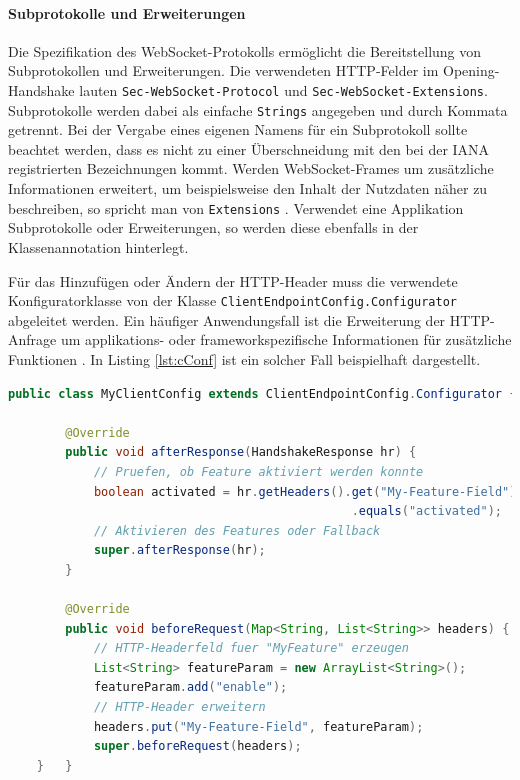\documentclass[11pt,a4paper,titlepage]{scrartcl}
\numberwithin{equation}{section}
\begin{document}
\begin{mdframed}[hidealllines=true,backgroundcolor=lightgray]
\paragraph{Subprotokolle und Erweiterungen}
Die Spezifikation des WebSocket-Protokolls ermöglicht die Bereitstellung von Subprotokollen und Erweiterungen. Die verwendeten HTTP-Felder im Opening-Handshake lauten \texttt{Sec-WebSocket-Protocol} und \texttt{Sec-WebSocket-Extensions}. Subprotokolle werden dabei als einfache \texttt{Strings} angegeben und durch Kommata getrennt. Bei der Vergabe eines eigenen Namens für ein Subprotokoll sollte beachtet werden, dass es nicht zu einer Überschneidung mit den bei der IANA registrierten Bezeichnungen kommt. Werden WebSocket-Frames um zusätzliche Informationen erweitert, um beispielsweise den Inhalt der Nutzdaten näher zu beschreiben, so spricht man von \texttt{Extensions} \autocite[102]{coward_java_2014}. Verwendet eine Applikation Subprotokolle oder Erweiterungen, so werden diese ebenfalls in der Klassenannotation hinterlegt.\\
\end{mdframed}
\noindent Für das Hinzufügen oder Ändern der HTTP-Header muss die verwendete Konfiguratorklasse von der Klasse \texttt{ClientEndpointConfig.Configurator} abgeleitet werden. Ein häufiger Anwendungsfall ist die Erweiterung der HTTP-Anfrage um applikations- oder frameworkspezifische Informationen für zusätzliche Funktionen \autocite[104]{coward_java_2014}. In Listing \ref{lst:cConf} ist ein solcher Fall beispielhaft dargestellt.\medskip

\begin{lstlisting}[frame=single, language=Java, caption=Java: ClientEndpointConfig-Konfigurationsklasse, label=lst:cConf]
	public class MyClientConfig extends ClientEndpointConfig.Configurator {

		@Override
		public void afterResponse(HandshakeResponse hr) {
			// Pruefen, ob Feature aktiviert werden konnte
			boolean activated = hr.getHeaders().get("My-Feature-Field").get(0)
												.equals("activated"); 	
			// Aktivieren des Features oder Fallback
			super.afterResponse(hr);
		}

		@Override
		public void beforeRequest(Map<String, List<String>> headers) {
			// HTTP-Headerfeld fuer "MyFeature" erzeugen
			List<String> featureParam = new ArrayList<String>();
			featureParam.add("enable");
			// HTTP-Header erweitern
			headers.put("My-Feature-Field", featureParam);
			super.beforeRequest(headers);
	}	}
\end{lstlisting}
\end{document}

